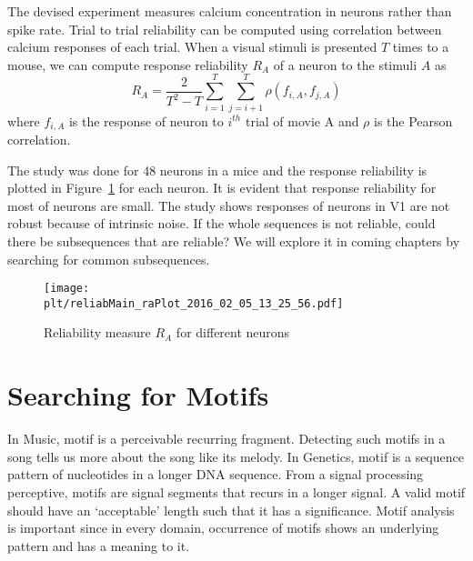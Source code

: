 \documentclass[MTech]{iitmdiss}
\newcommand{\plt}{thesis_plots}
\begin{document}
The devised experiment measures calcium concentration in neurons rather than spike rate. Trial to trial reliability can be computed using correlation between calcium responses of each trial. When a visual stimuli is presented $T$ times to a mouse, we can compute response reliability $R_A$ of a neuron to the stimuli $A$ as
$$R_A = \frac{2}{T^2 - T}\sum_{i=1}^T \sum_{j=i+1}^T \rho(f_{i, A}, f_{j, A})$$
where $f_{i, A}$ is the response of neuron to $i^{th}$ trial of movie A and $\rho$ is the Pearson correlation.

The study was done for 48 neurons in a mice and the response reliability is plotted in Figure~\ref{img:ra} for each neuron. It is evident that response reliability for most of neurons are small. The study shows responses of neurons in V1 are not robust because of intrinsic noise. If the whole sequences is not reliable, could there be subsequences that are reliable? We will explore it in coming chapters by searching for common subsequences.
\begin{figure}[h]
    \centering
    \texttt{[image: \\plt/reliabMain\_raPlot\_2016\_02\_05\_13\_25\_56.pdf]}
    \caption{Reliability measure $R_A$ for different neurons}
    \label{img:ra}
\end{figure} 
\chapter{Searching for Motifs}       %
\label{chap:searchmotif}
In Music, motif is a perceivable recurring fragment. Detecting such motifs in a song tells us more about the song like its melody. In Genetics, motif is a sequence pattern of nucleotides in a longer DNA sequence. From a signal processing perceptive, motifs are signal segments that recurs in a longer signal. A valid motif should have an `acceptable' length such that it has a significance. Motif analysis is important since in every domain, occurrence of motifs shows an underlying pattern and has a meaning to it.
\end{document}
